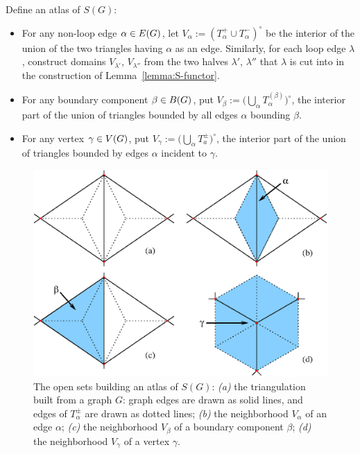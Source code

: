 Define an atlas of $S(G)$:
\begin{itemize}
\item For any non-loop edge $\alpha \in E(G)$, let $V_\alpha :=
  (T_\alpha^+ \cup T_\alpha^-)^\circ$ be the interior of the union of
  the two triangles having $\alpha$ as an edge.  Similarly, for each loop edge
  $\lambda$, construct domains $V_{\lambda'}$, $V_{\lambda''}$ from
  the two halves $\lambda'$, $\lambda''$ that $\lambda$ is cut into
  in the construction of Lemma~\ref{lemma:S-functor}.
\item For any boundary component $\beta \in B(G)$, put $V_\beta := \bigl(
  \bigcup_{\alpha} T_\alpha^{(\beta)} \bigr)^\circ$, the interior part of the union of triangles
  bounded by all edges $\alpha$ bounding $\beta$.
\item For any vertex $\gamma \in V(G)$, put $V_\gamma := \bigl( \bigcup_\alpha T_a^\pm
  \bigr)^\circ$, the interior part of the union of triangles bounded by
  edges $\alpha$ incident to $\gamma$.
\end{itemize}
\begin{figure}[btp]
  \centering\includegraphics[width=\textwidth]{atlas}
  \caption{The open sets building an atlas of $S(G)$: \textsl{(a)} the
    triangulation built from a graph $G$: graph edges are drawn as
    solid lines, and edges of $T_\alpha^{\pm}$ are drawn as dotted
    lines; \textsl{(b)} the neighborhood $V_\alpha$ of an edge
    $\alpha$; \textsl{(c)} the neighborhood $V_\beta$ of a boundary
    component $\beta$; \textsl{(d)} the neighborhood $V_\gamma$ of a
    vertex $\gamma$.}
  \label{fig:atlas}
\end{figure}

